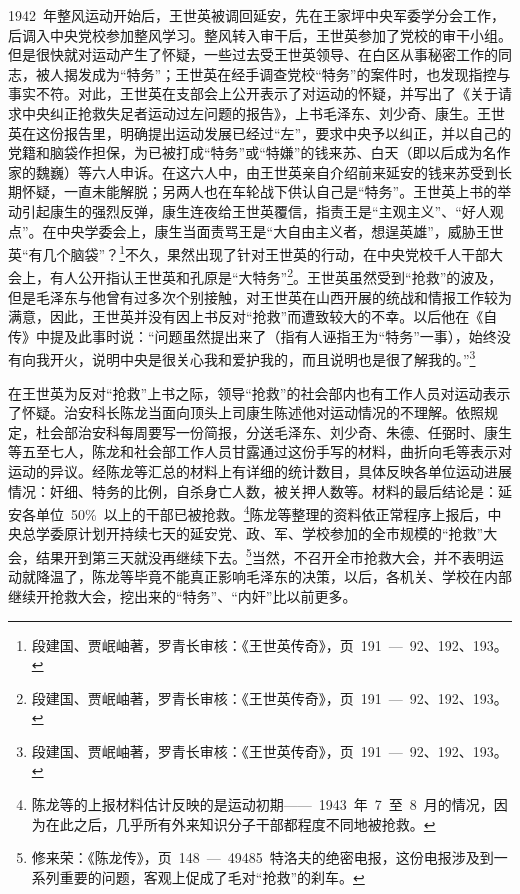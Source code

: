 1942~年整风运动开始后，王世英被调回延安，先在王家坪中央军委学分会工作，后调入中央党校参加整风学习。整风转入审干后，王世英参加了党校的审干小组。但是很快就对运动产生了怀疑，一些过去受王世英领导、在白区从事秘密工作的同志，被人揭发成为“特务”；王世英在经手调查党校“特务”的案件时，也发现指控与事实不符。对此，王世英在支部会上公开表示了对运动的怀疑，并写出了《关于请求中央纠正抢救失足者运动过左问题的报告》，上书毛泽东、刘少奇、康生。王世英在这份报告里，明确提出运动发展已经过“左”，要求中央予以纠正，并以自己的党籍和脑袋作担保，为已被打成“特务”或“特嫌”的钱来苏、白天（即以后成为名作家的魏巍）等六人申诉。在这六人中，由王世英亲自介绍前来延安的钱来苏受到长期怀疑，一直未能解脱；另两人也在车轮战下供认自己是“特务”。王世英上书的举动引起康生的强烈反弹，康生连夜给王世英覆信，指责王是“主观主义”、“好人观点”。在中央学委会上，康生当面责骂王是“大自由主义者，想逞英雄”，威胁王世英“有几个脑袋”？\footnote{段建国、贾岷岫著，罗青长审核：《王世英传奇》，页~191~—~92、192、193。}不久，果然出现了针对王世英的行动，在中央党校千人干部大会上，有人公开指认王世英和孔原是“大特务”\footnote{段建国、贾岷岫著，罗青长审核：《王世英传奇》，页~191~—~92、192、193。}。王世英虽然受到“抢救”的波及，但是毛泽东与他曾有过多次个别接触，对王世英在山西开展的统战和情报工作较为满意，因此，王世英并没有因上书反对“抢救”而遭致较大的不幸。以后他在《自传》中提及此事时说：“问题虽然提出来了（指有人诬指王为“特务”一事），始终没有向我开火，说明中央是很关心我和爱护我的，而且说明也是很了解我的。”\footnote{段建国、贾岷岫著，罗青长审核：《王世英传奇》，页~191~—~92、192、193。}

在王世英为反对“抢救”上书之际，领导“抢救”的社会部内也有工作人员对运动表示了怀疑。治安科长陈龙当面向顶头上司康生陈述他对运动情况的不理解。依照规定，杜会部治安科每周要写一份简报，分送毛泽东、刘少奇、朱德、任弼时、康生等五至七人，陈龙和社会部工作人员甘露通过这份手写的材料，曲折向毛等表示对运动的异议。经陈龙等汇总的材料上有详细的统计数目，具体反映各单位运动进展情况：奸细、特务的比例，自杀身亡人数，被关押人数等。材料的最后结论是：延安各单位~50\%~以上的干部已被抢救。\footnote{陈龙等的上报材料估计反映的是运动初期——~1943~年~7~至~8~月的情况，因为在此之后，几乎所有外来知识分子干部都程度不同地被抢救。}陈龙等整理的资料依正常程序上报后，中央总学委原计划开持续七天的延安党、政、军、学校参加的全市规模的“抢救”大会，结果开到第三天就没再继续下去。\footnote{修来荣：《陈龙传》，页~148~—~49485~特洛夫的绝密电报，这份电报涉及到一系列重要的问题，客观上促成了毛对“抢救”的刹车。}当然，不召开全市抢救大会，并不表明运动就降温了，陈龙等毕竟不能真正影响毛泽东的决策，以后，各机关、学校在内部继续开抢救大会，挖出来的“特务”、“内奸”比以前更多。

